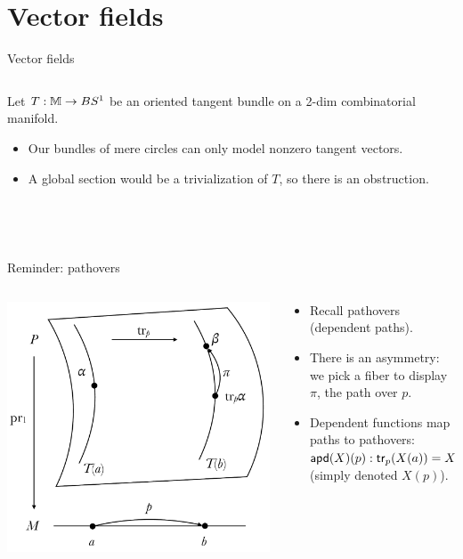 \section{Vector fields}

\begin{frame}{Vector fields}
\begin{columns}
\begin{column}{0.7\textwidth}
Let \( T:\mathbb{M}\to BS^1 \) be an oriented tangent bundle on a 2-dim combinatorial manifold.
\begin{itemize}
\item Our bundles of mere circles can only model \alert{nonzero} tangent vectors.
\item  A global section would be a trivialization of \( T \), so there is an obstruction.
\end{itemize}
\quad\\~\\
\end{column}
\begin{column}{0.3\textwidth}

\end{column}
\end{columns}
\end{frame}

\begin{frame}{Reminder: pathovers}
\begin{columns}
\begin{column}{0.35\textwidth}
\includegraphics[width=30ex]{figs/pathovers.pdf}
\end{column}
\begin{column}{0.65\textwidth}
\begin{itemize}
\item Recall pathovers (dependent paths).
\item There is an asymmetry: we pick a fiber to display \( \pi \), the path over \( p \).
\item Dependent functions map paths to pathovers: \( \mathsf{apd} (X)(p):\mathsf{tr}_p(X(a))=X(b) \) (simply denoted \( X(p) \)).
\end{itemize}
\end{column}
\end{columns}
\end{frame}

